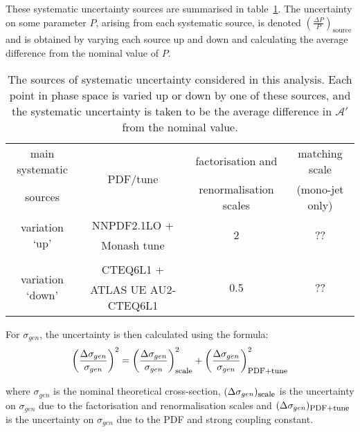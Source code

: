 
These systematic uncertainty sources are summarised in table~\ref{tab:syst_unc}. The uncertainty on some parameter $P$, arising from each systematic source, is denoted $\left ( \frac{\Delta P}{P} \right)_{\mathrm{source}}$ and is obtained by varying each source up and down and calculating the average difference from the nominal value of $P$.


\begin{table}
\centering
\begin{tabular}{c|c|c|c}
\hline
\hline
main systematic & \multirow{2}{*}{PDF/tune} & factorisation and & matching scale \T \\
sources & & renormalisation scales & (mono-jet only) \B \\
\hline
\multirow{2}{*}{variation `up'} & NNPDF2.1LO + & \multirow{2}{*}{2} & \multirow{2}{*}{??} \T \\
& Monash tune & & \B \\
& & & \\
\multirow{2}{*}{variation `down'} & CTEQ6L1 + & \multirow{2}{*}{0.5} & \multirow{2}{*}{??} \T \\
& ATLAS UE AU2-CTEQ6L1 & & \B \\
\hline
\hline
\end{tabular}
\caption{The sources of systematic uncertainty considered in this analysis. Each point in phase space is varied up or down by one of these sources, and the systematic uncertainty is taken to be the average difference in $\mathcal{A}'$ from the nominal value.}
\label{tab:syst_unc}
\end{table}



For $\sigma_{gen}$, the uncertainty is then calculated using the formula:
\begin{equation}
\label{uncertainty_sigma_gen}
\left(\frac{\Delta \sigma_{gen}}{\sigma_{gen}}\right)^{2} = \left(\frac{\Delta \sigma_{gen}}{\sigma_{gen}}\right)_{\mbox{\footnotesize scale}}^{2} + \left(\frac{\Delta \sigma_{gen}}{\sigma_{gen}}\right)_{\mbox{\footnotesize PDF+tune}}^{2}
\end{equation}

where $\sigma_{gen}$ is the nominal theoretical cross-section, $(\Delta \sigma_{gen})_{\mbox{\footnotesize scale}}$ is the uncertainty on $\sigma_{gen}$ due to the factorisation and renormalisation scales and $(\Delta \sigma_{gen})_{\mbox{\footnotesize PDF+tune}}$ is the uncertainty on $\sigma_{gen}$ due to the PDF and strong coupling constant.

